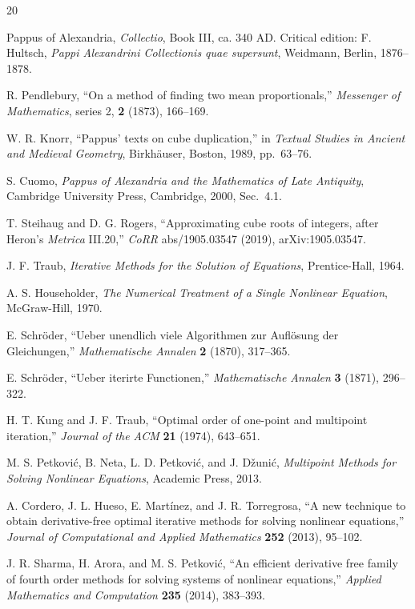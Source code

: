 \documentclass[10pt,a4paper]{article}
\theoremstyle{plain}
\theoremstyle{definition}
\theoremstyle{remark}
\begin{document}
\begin{thebibliography}{20}

Pappus of Alexandria,
\textit{Collectio}, Book III, ca. 340 AD.
Critical edition: F. Hultsch, \textit{Pappi Alexandrini Collectionis quae supersunt},
Weidmann, Berlin, 1876--1878.

R. Pendlebury,
``On a method of finding two mean proportionals,''
\textit{Messenger of Mathematics}, series 2, \textbf{2} (1873), 166--169.

W. R. Knorr,
``Pappus' texts on cube duplication,'' in
\textit{Textual Studies in Ancient and Medieval Geometry},
Birkh\"auser, Boston, 1989, pp.~63--76.

S. Cuomo,
\textit{Pappus of Alexandria and the Mathematics of Late Antiquity},
Cambridge University Press, Cambridge, 2000, Sec.~4.1.

T. Steihaug and D. G. Rogers,
``Approximating cube roots of integers, after Heron's \textit{Metrica} III.20,''
\textit{CoRR} abs/1905.03547 (2019), arXiv:1905.03547.

J. F. Traub,
\textit{Iterative Methods for the Solution of Equations},
Prentice-Hall, 1964.

A. S. Householder,
\textit{The Numerical Treatment of a Single Nonlinear Equation},
McGraw-Hill, 1970.

E. Schr\"oder,
``Ueber unendlich viele Algorithmen zur Aufl\"osung der Gleichungen,''
\textit{Mathematische Annalen} \textbf{2} (1870), 317--365.

E. Schr\"oder,
``Ueber iterirte Functionen,''
\textit{Mathematische Annalen} \textbf{3} (1871), 296--322.

H. T. Kung and J. F. Traub,
``Optimal order of one-point and multipoint iteration,''
\textit{Journal of the ACM} \textbf{21} (1974), 643--651.

M. S. Petkovi\'c, B. Neta, L. D. Petkovi\'c, and J. D\v{z}uni\'c,
\textit{Multipoint Methods for Solving Nonlinear Equations},
Academic Press, 2013.

A. Cordero, J. L. Hueso, E. Mart\'inez, and J. R. Torregrosa,
``A new technique to obtain derivative-free optimal iterative methods for solving nonlinear equations,''
\textit{Journal of Computational and Applied Mathematics} \textbf{252} (2013), 95--102.

J. R. Sharma, H. Arora, and M. S. Petkovi\'c,
``An efficient derivative free family of fourth order methods for solving systems of nonlinear equations,''
\textit{Applied Mathematics and Computation} \textbf{235} (2014), 383--393.

\end{thebibliography}
\end{document}

